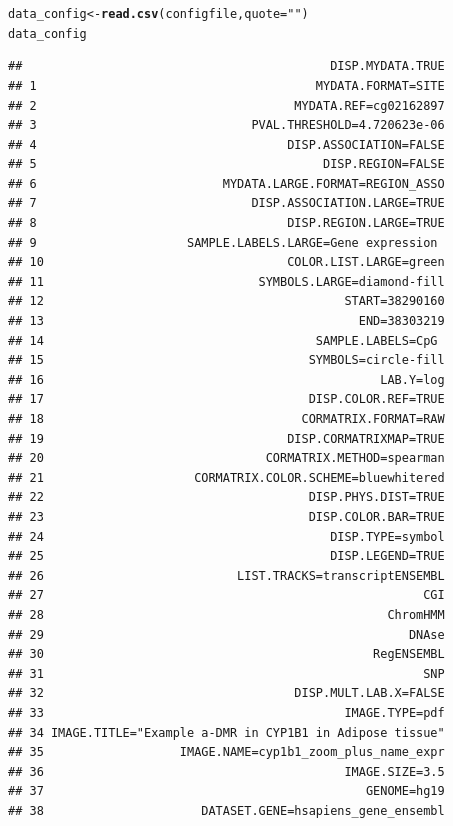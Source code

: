 \documentclass[11pt]{article}\usepackage[]{graphicx}\usepackage[usenames,dvipsnames]{color}
\makeatletter
\newcommand{\hlstr}[1]{\textcolor[rgb]{0.192,0.494,0.8}{#1}}%
\newcommand{\hlstd}[1]{\textcolor[rgb]{0.345,0.345,0.345}{#1}}%
\newcommand{\hlkwb}[1]{\textcolor[rgb]{0.69,0.353,0.396}{#1}}%
\newcommand{\hlkwc}[1]{\textcolor[rgb]{0.333,0.667,0.333}{#1}}%
\newcommand{\hlkwd}[1]{\textcolor[rgb]{0.737,0.353,0.396}{\textbf{#1}}}%
\newenvironment{kframe}{%
 \def\at@end@of@kframe{}%
 \ifinner\ifhmode%
  \def\at@end@of@kframe{\end{minipage}}%
  \begin{minipage}{\columnwidth}%
 \fi\fi%
 \def\FrameCommand##1{\hskip\@totalleftmargin \hskip-\fboxsep
 \colorbox{shadecolor}{##1}\hskip-\fboxsep
     \hskip-\linewidth \hskip-\@totalleftmargin \hskip\columnwidth}%
 \MakeFramed {\advance\hsize-\width
   \@totalleftmargin\z@ \linewidth\hsize
   \@setminipage}}%
 {\par\unskip\endMakeFramed%
 \at@end@of@kframe}
\newenvironment{knitrout}{}{} %
\makeatother
\begin{document}
\begin{knitrout}
\begin{kframe}
\begin{alltt}
\hlstd{data_config} \hlkwb{<-}\hlkwd{read.csv}\hlstd{(configfile,} \hlkwc{quote} \hlstd{=} \hlstr{""}\hlstd{)}
\hlstd{data_config}
\end{alltt}
\begin{verbatim}
##                                           DISP.MYDATA.TRUE
## 1                                       MYDATA.FORMAT=SITE
## 2                                    MYDATA.REF=cg02162897
## 3                              PVAL.THRESHOLD=4.720623e-06
## 4                                   DISP.ASSOCIATION=FALSE
## 5                                        DISP.REGION=FALSE
## 6                          MYDATA.LARGE.FORMAT=REGION_ASSO
## 7                              DISP.ASSOCIATION.LARGE=TRUE
## 8                                   DISP.REGION.LARGE=TRUE
## 9                     SAMPLE.LABELS.LARGE=Gene expression 
## 10                                  COLOR.LIST.LARGE=green
## 11                              SYMBOLS.LARGE=diamond-fill
## 12                                          START=38290160
## 13                                            END=38303219
## 14                                      SAMPLE.LABELS=CpG 
## 15                                     SYMBOLS=circle-fill
## 16                                               LAB.Y=log
## 17                                     DISP.COLOR.REF=TRUE
## 18                                    CORMATRIX.FORMAT=RAW
## 19                                  DISP.CORMATRIXMAP=TRUE
## 20                               CORMATRIX.METHOD=spearman
## 21                     CORMATRIX.COLOR.SCHEME=bluewhitered
## 22                                     DISP.PHYS.DIST=TRUE
## 23                                     DISP.COLOR.BAR=TRUE
## 24                                        DISP.TYPE=symbol
## 25                                        DISP.LEGEND=TRUE
## 26                           LIST.TRACKS=transcriptENSEMBL
## 27                                                     CGI
## 28                                                ChromHMM
## 29                                                   DNAse
## 30                                              RegENSEMBL
## 31                                                     SNP
## 32                                   DISP.MULT.LAB.X=FALSE
## 33                                          IMAGE.TYPE=pdf
## 34 IMAGE.TITLE="Example a-DMR in CYP1B1 in Adipose tissue"
## 35                   IMAGE.NAME=cyp1b1_zoom_plus_name_expr
## 36                                          IMAGE.SIZE=3.5
## 37                                             GENOME=hg19
## 38                      DATASET.GENE=hsapiens_gene_ensembl

\end{verbatim}
\end{kframe}
\end{knitrout}
\end{document}
